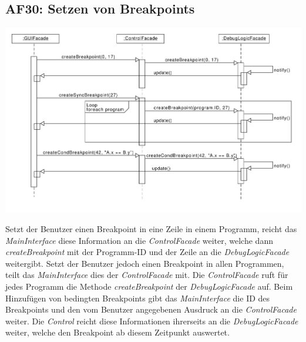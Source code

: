 \documentclass[parskip=full]{scrartcl}
\begin{document}
\subsection{AF30: Setzen von Breakpoints}
\begin{center}
\includegraphics[width=1.0\textwidth]{diagrammIdeenUmlet/SequenceDiagrams/seq_breakpointsPDF.pdf}
\end{center}
Setzt der Benutzer einen Breakpoint in eine Zeile in einem Programm, reicht das \textit{MainInterface} diese Information an die \textit{ControlFacade} weiter, welche dann \textit{createBreakpoint} mit der Programm-ID und der Zeile an die \textit{DebugLogicFacade} weitergibt.
Setzt der Benutzer jedoch einen Breakpoint in allen Programmen, teilt das \textit{MainInterface} dies der \textit{ControlFacade} mit. 
Die \textit{ControlFacade} ruft für jedes Programm die Methode \textit{createBreakpoint} der \textit{DebugLogicFacade} auf.
Beim Hinzufügen von bedingten Breakpoints gibt das \textit{MainInterface} die ID des Breakpoints und den vom Benutzer angegebenen Ausdruck an die \textit{ControlFacade} weiter. 
Die \textit{Control} reicht diese Informationen ihrerseits an die \textit{DebugLogicFacade} weiter, welche den Breakpoint ab diesem Zeitpunkt auswertet.

\newpage
\end{document}
